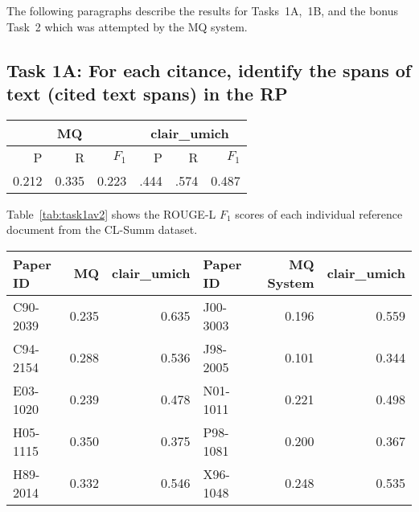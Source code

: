\documentclass[11pt]{article}
\begin{document}
The following paragraphs describe the results for Tasks~1A,~1B, and the
bonus Task~2 which was attempted by the MQ system.

\subsection{Task 1A: For each citance, identify the spans of text 
(cited text spans) in the RP}

\begin{table*}
\centering
	\begin{tabular}{|r|r|r|r|r|r|}
	\hline
	\multicolumn{3}{|c|}{MQ} & \multicolumn{3}{|c|}{clair\_umich}\\
	\hline
	P & R & $F_1$ & P & R & $F_1$\\
	\hline
 	0.212 & 0.335 & 0.223 & .444 & .574 & 0.487\\
	\hline
	\end{tabular}
\caption{Task~1A performance for the participating systems expressed as ROUGE-L score
 averaged over all topics.}
\label{tab:task1a}
\end{table*}

Table~\ref{tab:task1av2} shows the ROUGE-L $F_1$ scores of each individual 
reference document from the CL-Summ dataset.

\begin{table*}
  \centering
  \begin{tabular}{|l|r|r||l|r|r|}
  	\hline
	Paper ID & MQ  & clair\_umich & Paper ID & MQ System & clair\_umich \\
	\hline
	C90-2039 & 0.235 & 0.635 &	J00-3003 & 0.196 & 0.559\\
	C94-2154 & 0.288 & 0.536 &	J98-2005 & 0.101 & 0.344\\
	E03-1020 & 0.239 & 0.478 &	N01-1011 & 0.221 & 0.498\\
	H05-1115 & 0.350 & 0.375 &	P98-1081 & 0.200 & 0.367\\
	H89-2014 & 0.332 & 0.546 &	X96-1048 & 0.248 & 0.535\\
	\hline
  \end{tabular}
\caption{Task~1A ROUGE-L F1 scores for individual topics.}
\label{tab:task1av2}
\end{table*}
\end{document}
